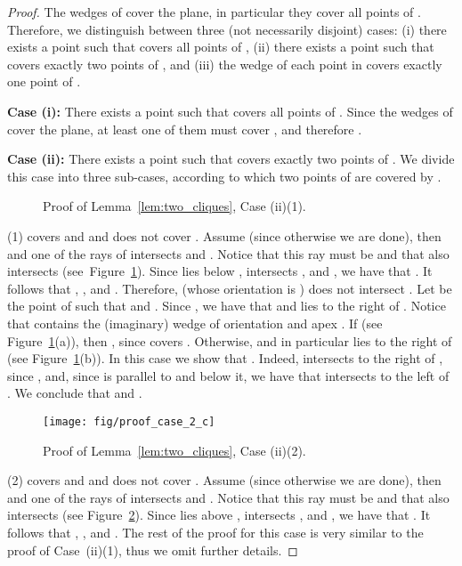 \documentclass[11pt]{article}
\begin{document}
\begin{proof}
The wedges of  cover the plane, in particular they cover all points of . Therefore, we distinguish between three (not necessarily disjoint) cases: 
(i) there exists a point  such that  covers all points of , 
(ii) there exists a point  such that  covers exactly two points of , and 
(iii) the wedge of each point in  covers exactly one point of .

{\bf Case (i):} There exists a point  such that  covers all points of . Since
the wedges of  cover the plane, at least one of them must cover , and therefore
.

{\bf Case (ii):} There exists a point  such that  covers exactly two points of . We divide this
case into three sub-cases, according to which two points of  are covered by .

\begin{figure}[htb]
 \centering
 \caption{Proof of Lemma~\ref{lem:two_cliques}, Case (ii)(1).}	\label{fig:case2b}	
\end{figure} 

(1)  covers  and  and does not cover . Assume  (since otherwise
we are done), then  and one of the rays of  intersects  and
. Notice that this ray must be  and that  also intersects  (see~Figure~\ref{fig:case2b}).
Since  lies below ,  intersects , and , we have that . 
It follows that , , and .
Therefore,  (whose orientation is ) does not intersect .
Let  be the point of  such that  and 
. Since , we have that
 and  lies to the right of . Notice that  contains the (imaginary) wedge of orientation  and apex . If  (see Figure~\ref{fig:case2b}(a)), then , since  covers . 
Otherwise,  and in particular  lies to the right of  (see Figure~\ref{fig:case2b}(b)). In this case we show that . Indeed,  intersects  to the right of , since , and, since  is parallel to  and below it, we have that  intersects  to the left of . We conclude that  and .

\begin{figure}[htb]
 \centering
       \texttt{[image: fig/proof\_case\_2\_c]}
 \caption{Proof of Lemma~\ref{lem:two_cliques}, Case (ii)(2).}	\label{fig:case2c}	
\end{figure} 
  
(2)  covers  and  and does not cover . Assume  (since otherwise
we are done), then 
and one of the rays of  intersects  and . Notice that this ray must be  and that  also intersects  (see Figure~\ref{fig:case2c}).
Since  lies above ,  intersects , and , we have that . 
It follows that , , and . The rest of the proof for this case is very similar to the proof of Case~(ii)(1), thus we omit further details.


\end{proof}
\end{document}
